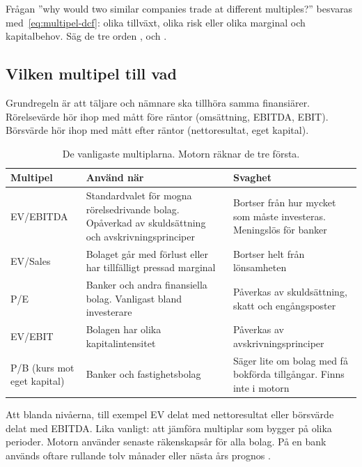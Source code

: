 \begin{intervjutips}
Frågan ”why would two similar companies trade at different multiples?” besvaras
med~\eqref{eq:multipel-dcf}: olika tillväxt, olika risk eller olika marginal och
kapitalbehov. Säg de tre orden ,  och .
\end{intervjutips}

\subsection{Vilken multipel till vad}

Grundregeln är att täljare och nämnare ska tillhöra samma finansiärer. Rörelsevärde hör ihop
med mått före räntor (omsättning, EBITDA, EBIT). Börsvärde hör ihop med mått efter räntor
(nettoresultat, eget kapital).

\begin{table}[ht]
\centering\small
\caption{De vanligaste multiplarna. Motorn räknar de tre första.}
\label{tab:multiplar}
\begin{tabularx}{\linewidth}{@{}l>{\raggedright\arraybackslash}X>{\raggedright\arraybackslash}X@{}}
\toprule
Multipel & Använd när & Svaghet \\
\midrule
EV/EBITDA & Standardvalet för mogna rörelsedrivande bolag. Opåverkad av skuldsättning och
  avskrivningsprinciper & Bortser från hur mycket som måste investeras. Meningslös för banker \\
EV/Sales & Bolaget går med förlust eller har tillfälligt pressad marginal & Bortser helt från
  lönsamheten \\
P/E & Banker och andra finansiella bolag. Vanligast bland investerare & Påverkas av
  skuldsättning, skatt och engångsposter \\
EV/EBIT & Bolagen har olika kapitalintensitet & Påverkas av avskrivningsprinciper \\
P/B (kurs mot eget kapital) & Banker och fastighetsbolag & Säger lite om bolag med få bokförda
  tillgångar. Finns inte i motorn \\
\bottomrule
\end{tabularx}
\end{table}

\begin{vanligtfel}
Att blanda nivåerna, till exempel EV delat med nettoresultat eller börsvärde delat med EBITDA.
Lika vanligt: att jämföra multiplar som bygger på olika perioder. Motorn använder senaste
räkenskapsår för alla bolag. På en bank används oftare rullande tolv månader  eller nästa års prognos .
\end{vanligtfel}

